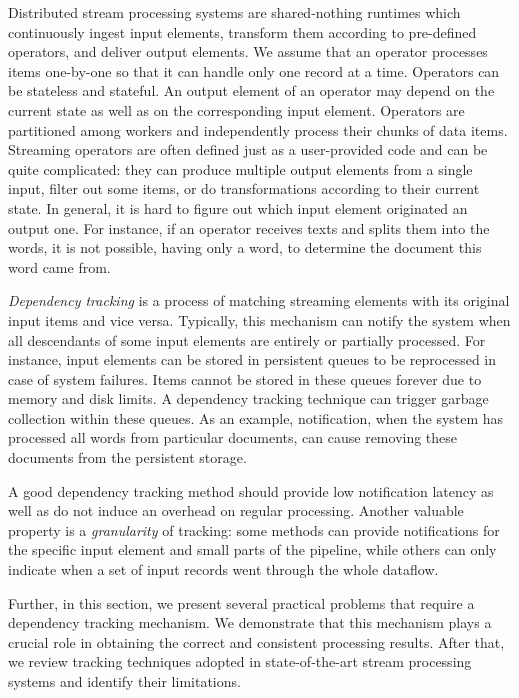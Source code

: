 \label {fs-acker-motivation}

Distributed stream processing systems are shared-nothing runtimes which continuously ingest input elements, transform them according to pre-defined operators, and deliver output elements. We assume that an operator processes items one-by-one so that it can handle only one record at a time. Operators can be stateless and stateful. An output element of an operator may depend on the current state as well as on the corresponding input element. Operators are partitioned among workers and independently process their chunks of data items. Streaming operators are often defined just as a user-provided code and can be quite complicated: they can produce multiple output elements from a single input, filter out some items, or do transformations according to their current state. In general, it is hard to figure out which input element originated an output one. For instance, if an operator receives texts and splits them into the words, it is not possible, having only a word, to determine the document this word came from.

{\em Dependency tracking} is a process of matching streaming elements with its original input items and vice versa. Typically, this mechanism can notify the system when all descendants of some input elements are entirely or partially processed. For instance, input elements can be stored in persistent queues to be reprocessed in case of system failures. Items cannot be stored in these queues forever due to memory and disk limits. A dependency tracking technique can trigger garbage collection within these queues. As an example, notification, when the system has processed all words from particular documents, can cause removing these documents from the persistent storage. 

A good dependency tracking method should provide low notification latency as well as do not induce an overhead on regular processing. Another valuable property is a {\em granularity} of tracking: some methods can provide notifications for the specific input element and small parts of the pipeline, while others can only indicate when a set of input records went through the whole dataflow.

Further, in this section, we present several practical problems that require a dependency tracking mechanism. We demonstrate that this mechanism plays a crucial role in obtaining the correct and consistent processing results. After that, we review tracking techniques adopted in state-of-the-art stream processing systems and identify their limitations. 

